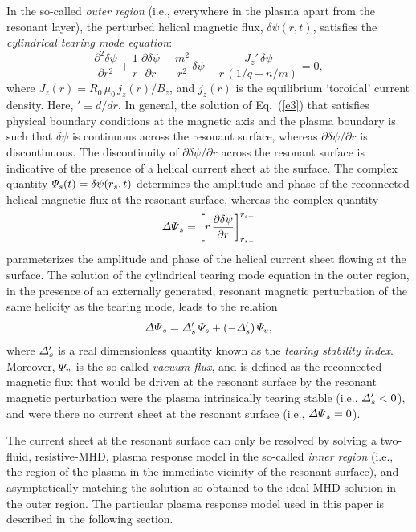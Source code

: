 \documentclass[12pt,prb,aps]{revtex4-1}
\begin{document}
In the so-called {\em outer region}\/ (i.e., everywhere in the plasma
apart from the resonant layer), the perturbed helical magnetic flux, $\delta\psi(r,t)$, satisfies the
{\em cylindrical tearing mode equation}:\cite{wes}
\begin{equation}\label{e3}
\frac{\partial^2\delta\psi}{\partial r^2} + \frac{1}{r}\,\frac{\partial\delta\psi}{\partial r}-\frac{m^2}{r^2}\,\delta\psi - \frac{J_z'\,\delta\psi}{r\,(1/q-n/m)}=  0,
\end{equation}
where 
$J_z(r)= R_0\,\mu_0\,j_z(r)/B_z$,
and $j_z(r)$ is the equilibrium `toroidal' current density. Here, $'\equiv d/dr$. In general, the solution of Eq.~(\ref{e3}) that satisfies physical
boundary conditions at the magnetic axis and the plasma boundary is such that $\delta\psi$ is continuous
across the resonant surface, whereas $\partial\delta\psi/\partial r$ is discontinuous. The discontinuity of
 $\partial\delta\psi/\partial r$ across the resonant surface is indicative of the presence of a helical current
 sheet at the surface.  The complex quantity ${\mit\Psi}_s(t)= \delta\psi(r_s,t)$ determines the amplitude
 and phase of the reconnected helical magnetic flux at the resonant surface, whereas the complex quantity\,\cite{rf1993}
 \begin{equation}
{\mit\Delta\Psi}_s = \left[r\,\frac{\partial \delta\psi}{\partial r}\right]_{r_{s-}}^{r_{s+}}
\end{equation}
parameterizes the amplitude and phase of the helical current sheet flowing at the surface. The solution of
the cylindrical tearing mode equation in the outer region, in the presence of an externally generated, resonant magnetic perturbation 
of the same helicity as the tearing mode, leads to the relation\,\cite{rf1993,fkr}
\begin{equation}\label{e110}
{\mit\Delta\Psi}_s= {\mit\Delta}_s'\,{\mit\Psi}_s + (-{\mit\Delta}_s')\,{\mit\Psi}_v,
\end{equation}
where ${\mit\Delta}_s'$ is a real dimensionless quantity known as the {\em tearing stability index}. Moreover,
${\mit\Psi}_v$ is the so-called {\em vacuum flux}, and is defined as the reconnected magnetic flux
that would be driven at the resonant surface by the resonant magnetic perturbation were the
plasma intrinsically tearing stable (i.e., ${\mit\Delta}_s' <0$), and were there no current sheet at the resonant surface
(i.e., ${\mit\Delta\Psi}_s=0$).

The current sheet at the resonant surface can only be resolved by solving  a two-fluid, resistive-MHD, plasma response model
in the so-called {\em inner region}\/ (i.e., the region of the plasma in the immediate vicinity of the resonant surface), 
and asymptotically matching the solution so obtained to the ideal-MHD solution in the outer region. The particular 
plasma response model used in this paper is
described in the following section. 
\end{document}
